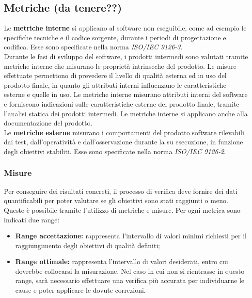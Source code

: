 	\subsection{Metriche (da tenere??)}
	Le \textbf{metriche interne} si applicano al software non eseguibile, come ad esempio le specifiche tecniche e il codice sorgente, durante i periodi di progettazione e codifica.
	Esse sono specificate nella norma \textit{ISO/IEC 9126-3}.\\
	Durante le fasi di sviluppo del software, i prodotti intermedi sono valutati tramite metriche interne che misurano le proprietà intrinseche del prodotto.
	Le misure effettuate permettono di prevedere il livello di qualità esterna ed in uso del prodotto finale, in quanto gli attributi interni influenzano le caratteristiche esterne e quelle in uso.
	Le metriche interne misurano attributi interni del software e forniscono indicazioni sulle caratteristiche esterne del prodotto finale, tramite l'analisi statica dei prodotti intermedi.
	Le metriche interne si applicano anche alla documentazione del prodotto.\\
	Le \textbf{metriche esterne} misurano i comportamenti del prodotto software rilevabili dai test, dall'operatività e dall'osservazione durante la su esecuzione, in funzione degli obiettivi stabiliti.
	Esse sono specificate nella norma \textit{ISO/IEC 9126-2}.
		
		\subsubsection{Misure}
		Per conseguire dei risultati concreti, il processo di verifica deve fornire dei dati quantificabili per poter valutare se gli obiettivi sono stati raggiunti o meno. Queste è possibile tramite l’utilizzo di metriche e misure. Per ogni metrica sono indicati due range:
		\begin{itemize}
			\item \textbf{Range accettazione:} rappresenta l'intervallo di valori minimi richiesti per il raggiungimento degli obiettivi di qualità definiti;
			\item \textbf{Range ottimale:} rappresenta l'intervallo di valori desiderati, entro cui dovrebbe collocarsi la misurazione. Nel caso in cui non si rientrasse in questo range, sarà necessario effettuare una verifica più accurata per individuarne le cause e poter applicare le dovute correzioni.
		\end{itemize}
	
